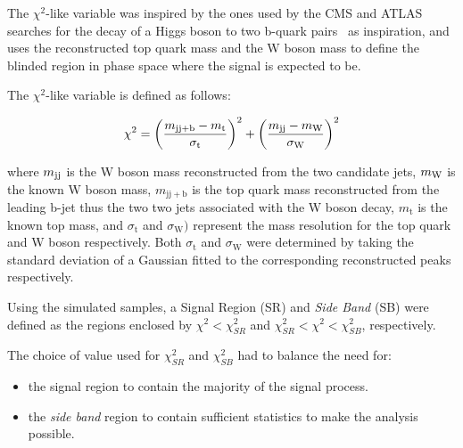 
The $\chi^{2}$-like variable was inspired by the ones used by the CMS and ATLAS searches for the decay of a Higgs boson to two b-quark pairs~\cite{CMS:2016tlj,TheATLAScollaboration:2016myw} as inspiration, and uses the reconstructed top quark mass and the W boson mass to define the blinded region in phase space where the signal is expected to be.


The $\chi^{2}$-like variable is defined as follows:

\begin{equation}\label{eq:blindingChi2}
   \chi^{2} = {\left(\frac{m_{\mathrm{jj+b}}-m_{\mathrm{t}}}{\sigma_{\mathrm{t}}}\right)}^{2} + {\left(\frac{m_{\rm jj}-m_{\rm W}}{\sigma_{\mathrm{W}}}\right)}^{2}
\end{equation}

where $m_{\rm jj}$ is the W boson mass reconstructed from the two candidate jets, $m_{\rm W}$ is the known W boson mass, $m_{\mathrm{jj+b}}$ is the top quark mass reconstructed from the leading b-jet thus the two two jets associated with the W boson decay, $m_{\mathrm{t}}$ is the known top mass, and $\sigma_{\mathrm{t}}$ and $\sigma_{\mathrm{W}})$ represent the mass resolution for the top quark and W boson respectively.
Both $\sigma_{\mathrm{t}}$ and $\sigma_{\mathrm{W}}$ were determined by taking the standard deviation of a Gaussian fitted to the corresponding reconstructed peaks respectively.

Using the simulated samples, a Signal Region (SR) and \emph{Side Band} (SB) were defined as the regions enclosed by $\chi^{2} < \chi^{2}_{SR}$ and $\chi^{2}_{SR} < \chi^{2} < \chi^{2}_{SB}$, respectively.

The choice of value used for $\chi^{2}_{SR}$ and $\chi^{2}_{SB}$ had to balance the need for:
\begin{itemize}
\item the signal region to contain the majority of the signal process.
\item the \emph{side band} region to contain sufficient statistics to make the analysis possible.
\end{itemize}

